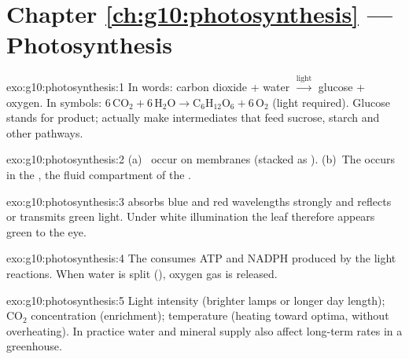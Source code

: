 \section*{Chapter \ref{ch:g10:photosynthesis} --- Photosynthesis}

\begin{solution}{exo:g10:photosynthesis:1}
In words: carbon dioxide + water $\xrightarrow{\text{light}}$ glucose +
oxygen. In symbols:
$6\,\mathrm{CO_2}+6\,\mathrm{H_2O}\to\mathrm{C_6H_{12}O_6}+6\,\mathrm{O_2}$
(light required). Glucose stands for  product;  actually make
intermediates that feed sucrose, starch and other pathways.
\end{solution}

\begin{solution}{exo:g10:photosynthesis:2}
(a)~ occur on  membranes (stacked as ).
(b)~The  occurs in the , the fluid compartment of the
.
\end{solution}

\begin{solution}{exo:g10:photosynthesis:3}
 absorbs blue and red wavelengths strongly and reflects or
transmits green light. Under white illumination the leaf therefore appears
green to the eye.
\end{solution}

\begin{solution}{exo:g10:photosynthesis:4}
The  consumes ATP and NADPH produced by the light reactions.
When water is split (), oxygen gas is released.
\end{solution}

\begin{solution}{exo:g10:photosynthesis:5}
Light intensity (brighter lamps or longer day length); $\mathrm{CO_2}$
concentration (enrichment); temperature (heating toward  optima, without
overheating). In practice water and mineral supply also affect long-term rates
in a greenhouse.
\end{solution}

